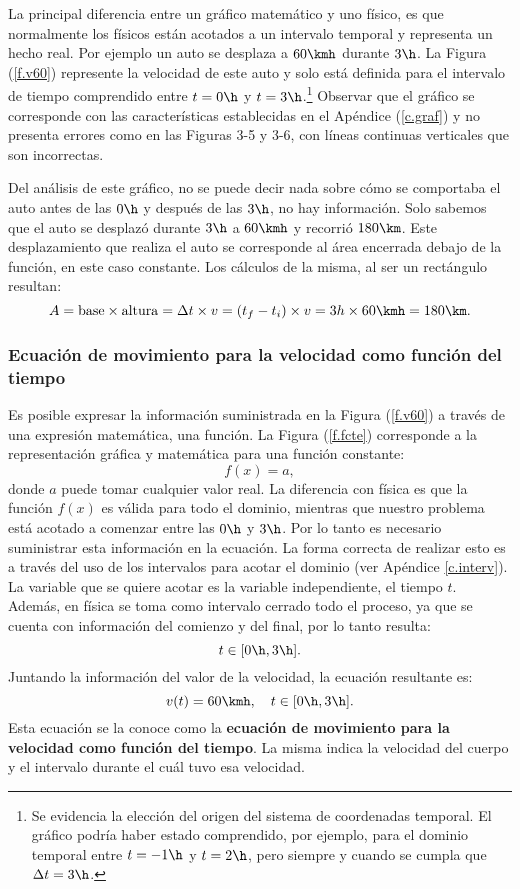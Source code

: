 

La principal diferencia entre un gráfico matemático y uno físico, es que
normalmente los físicos están acotados a un intervalo temporal y representa un
hecho real. Por ejemplo un auto se desplaza a $60\kmh$ durante $3\h$. La Figura
(\ref{f.v60}) represente la velocidad de este auto y solo está definida para el
intervalo de tiempo comprendido entre $t=0\h$ y $t=3\h$.\footnote{Se evidencia
la elección del origen del sistema de coordenadas temporal. El gráfico podría
haber estado comprendido, por ejemplo, para el dominio temporal entre $t=-1\h$ y
$t=2\h$, pero siempre y cuando se cumpla que $\Delta t = 3\h$.} Observar que el
gráfico se corresponde con las características establecidas en el Apéndice
(\ref{c.graf}) y no presenta errores como en las Figuras 3-5 y 3-6, con líneas
continuas verticales que son incorrectas.



Del análisis de este gráfico, no se puede decir nada sobre cómo se comportaba el
auto antes de las $0\h$ y después de las $3\h$, no hay información. Solo sabemos
que el auto se desplazó durante $3\h$ a $60\kmh$ y recorrió $180\km$. Este
desplazamiento que realiza el auto se corresponde al área encerrada debajo de la
función, en este caso constante. Los cálculos de la misma, al ser un rectángulo
resultan:
$$
A = \mathrm{base}\times\mathrm{altura} = \Delta t \times v = (t_f - t_i)\times v
= 3h\times 60\kmh = 180\km.
$$

\subsubsection{Ecuación de movimiento para la velocidad como función del tiempo}
\label{c.evxt}

Es posible expresar la información suministrada en la Figura (\ref{f.v60}) a
través de una expresión matemática, una función. La Figura (\ref{f.fcte})
corresponde a la representación gráfica y matemática para una función constante:
$$
f(x)=a,
$$
donde $a$ puede tomar cualquier valor real. La diferencia con física es que la
función $f(x)$ es válida para todo el dominio, mientras que nuestro problema
está acotado a comenzar entre las $0\h$ y $3\h$. Por lo tanto es necesario
suministrar esta información en la ecuación. La forma correcta de realizar esto
es a través del uso de los intervalos para acotar el dominio (ver Apéndice
\ref{c.interv}). La variable que se quiere acotar es la variable independiente,
el tiempo $t$. Además, en física se toma como intervalo cerrado todo el proceso,
ya que se cuenta con información del comienzo y del final, por lo tanto resulta:
$$
t \in [0\h,3\h].
$$
Juntando la información del valor de la velocidad, la ecuación resultante es:
\begin{equation*}
  v(t) = 60\kmh,\quad t \in [0\h,3\h].
\end{equation*}
Esta ecuación se la conoce como la {\bf ecuación de movimiento para la velocidad
como función del tiempo}. La misma indica la velocidad del cuerpo y el intervalo
durante el cuál tuvo esa velocidad.


